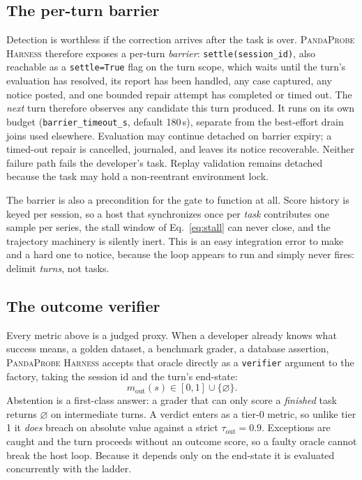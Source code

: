 \documentclass[11pt,letterpaper]{article}
\newcommand{\Harness}{\textsc{PandaProbe Harness}\xspace}
\newcommand{\outcome}{m_{\mathrm{out}}}
\begin{document}
\subsection{The per-turn barrier}
\label{sec:barrier}

Detection is worthless if the correction arrives after the task is over. \Harness therefore exposes
a per-turn \emph{barrier}: \texttt{settle(session\_id)}, also reachable as a \texttt{settle=True}
flag on the turn scope, which waits until the turn's evaluation has resolved, its
report has been handled, any case captured, any notice posted, and one bounded repair
attempt has completed or timed out. The \emph{next} turn therefore observes any candidate this
turn produced. It runs on its own budget
(\texttt{barrier\_timeout\_s}, default 180\,s), separate from the best-effort drain joins used
elsewhere. Evaluation may continue detached on barrier expiry; a timed-out repair is cancelled,
journaled, and leaves its notice recoverable. Neither failure path fails the developer's task.
Replay validation remains detached because the task may hold a non-reentrant environment lock.

The barrier is also a precondition for the gate to function at all. Score history is keyed per
session, so a host that synchronizes once per \emph{task} contributes one sample per series, the
stall window of Eq.~\eqref{eq:stall} can never close, and the trajectory machinery is silently
inert. This is an easy integration error to make and a hard one to notice, because the loop appears
to run and simply never fires: delimit \emph{turns}, not tasks.

\subsection{The outcome verifier}
\label{sec:verifier}

Every metric above is a judged proxy. When a developer already knows what success means, a golden
dataset, a benchmark grader, a database assertion, \Harness accepts that oracle directly as a
\texttt{verifier} argument to the factory, taking the session id and the turn's end-state:
\begin{equation}
  \outcome(s)\in[0,1]\cup\{\varnothing\}.
  \label{eq:verifier}
\end{equation}
Abstention is a first-class answer: a grader that can only score a \emph{finished} task returns
$\varnothing$ on intermediate turns. A verdict enters as a tier-0 metric, so unlike tier 1 it
\emph{does} breach on absolute value against a strict $\tau_{\mathrm{out}}{=}0.9$. Exceptions are
caught and the turn proceeds without an outcome score, so a faulty oracle cannot break the host
loop. Because it depends only on the end-state it is evaluated concurrently with the ladder.
\end{document}
